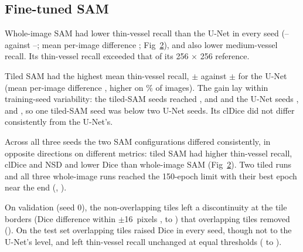 

\begin{figure}[!h]
\caption{\CapAblation}
\label{fig:ablation}
\end{figure}

\subsection*{Fine-tuned SAM}
Whole-image SAM had lower thin-vessel recall than the U-Net in every seed (\SAMWholeThinSeedMin--\SAMWholeThinSeedMax{}
against \UNetThinSeedMin--\UNetThinSeedMax; mean per-image difference \SAMWholeThinDiff; Fig~\ref{fig:sam}), and also lower
medium-vessel recall. Its thin-vessel recall exceeded that of its 256 $\times$ 256 reference.

Tiled SAM had the highest mean thin-vessel recall, \SAMTiledThinMean{} $\pm$ \SAMTiledThinSdSeed{} against \UNetThinMean{}
$\pm$ \UNetThinSdSeed{} for the U-Net (mean per-image difference \SAMTiledThinDiff, higher on \SAMTiledThinShare\% of
images). The gain lay within training-seed variability: the tiled-SAM seeds reached \SAMTiledThinSeedA, \SAMTiledThinSeedB{}
and \SAMTiledThinSeedC{} and the U-Net seeds \UNetThinSeedA, \UNetThinSeedB{} and \UNetThinSeedC, so one tiled-SAM seed was
below two U-Net seeds. Its clDice did not differ consistently from the U-Net's.

Across all three seeds the two SAM configurations differed consistently, in opposite directions on different metrics:
tiled SAM had higher thin-vessel recall, clDice and NSD and lower Dice than whole-image SAM (Fig~\ref{fig:sam}). Two tiled
runs and all three whole-image runs reached the 150-epoch limit with their best epoch near the end (,
).

\begin{figure}[!h]
\caption{\CapSam}
\label{fig:sam}
\end{figure}

On validation (seed 0), the non-overlapping tiles left a discontinuity at the tile borders (Dice difference within
$\pm$16~pixels \SeamSAMTiledDiDDice, \SeamSAMTiledDiDDiceLo{} to \SeamSAMTiledDiDDiceHi) that overlapping tiles removed
(). On the test set overlapping tiles raised Dice in every seed, though not to the U-Net's level, and left
thin-vessel recall unchanged at equal thresholds (\CurveOverlapMinusTiledMinTest{} to \CurveOverlapMinusTiledMaxTest).

